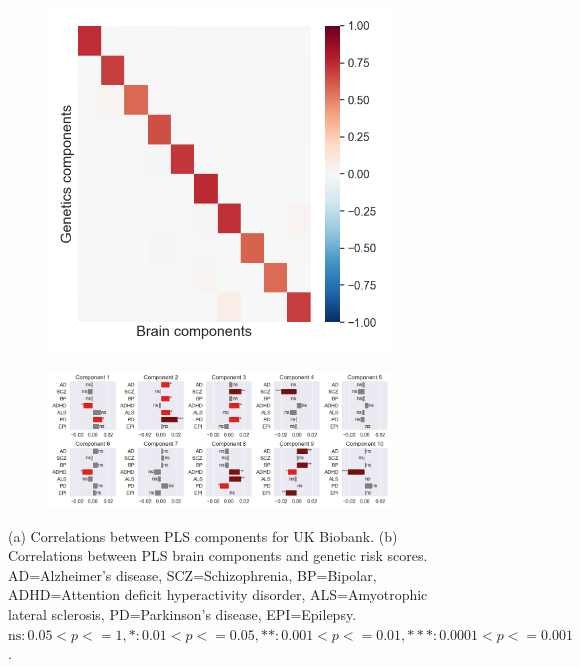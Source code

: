 \begin{figure}
\centering
     \begin{subfigure}[b]{0.27\textwidth}
         \centering
          \includegraphics[width=\textwidth,trim={0.8cm 0cm 0.3cm 0cm}]{figures/UKBB/cross_corr.png}
          \caption{}
          \label{fig:UKBB_corr}
     \end{subfigure}
     \begin{subfigure}[b]{0.72\textwidth}
         \centering
          \includegraphics[width=\textwidth,trim={0.5cm 0cm 0.7cm 0cm}]{figures/UKBB/prs_correlations.png}
          \caption{}
          \label{fig:genetic_risk}
     \end{subfigure}
\caption{(a) Correlations between PLS components for UK Biobank. (b) Correlations between PLS brain components and genetic risk scores. AD=Alzheimer's disease, SCZ=Schizophrenia, BP=Bipolar, ADHD=Attention deficit hyperactivity disorder, ALS=Amyotrophic lateral sclerosis, PD=Parkinson's disease, EPI=Epilepsy. $\text{ns}: 0.05< p <= 1, \ast: 0.01< p <=0.05, \ast\ast: 0.001< p <= 0.01, \ast\ast\ast: 0.0001< p <= 0.001$.}
\end{figure}

